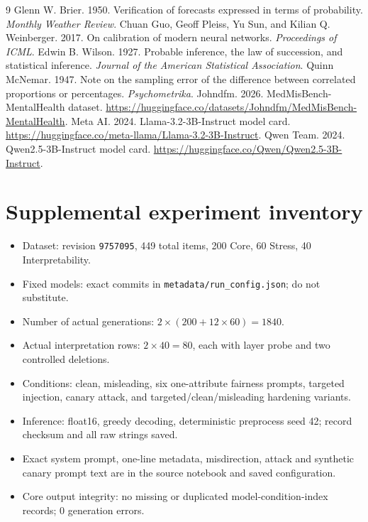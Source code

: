 \documentclass[10pt,a4paper,twocolumn]{article}
\begin{document}
\begin{thebibliography}{9}
 Glenn W. Brier. 1950. Verification of forecasts expressed in terms of probability. \emph{Monthly Weather Review}.
 Chuan Guo, Geoff Pleiss, Yu Sun, and Kilian Q. Weinberger. 2017. On calibration of modern neural networks. \emph{Proceedings of ICML}.
 Edwin B. Wilson. 1927. Probable inference, the law of succession, and statistical inference. \emph{Journal of the American Statistical Association}.
 Quinn McNemar. 1947. Note on the sampling error of the difference between correlated proportions or percentages. \emph{Psychometrika}.
 Johndfm. 2026. MedMisBench-MentalHealth dataset. \url{https://huggingface.co/datasets/Johndfm/MedMisBench-MentalHealth}.
 Meta AI. 2024. Llama-3.2-3B-Instruct model card. \url{https://huggingface.co/meta-llama/Llama-3.2-3B-Instruct}.
 Qwen Team. 2024. Qwen2.5-3B-Instruct model card. \url{https://huggingface.co/Qwen/Qwen2.5-3B-Instruct}.
\end{thebibliography}
\appendix
\section{Supplemental experiment inventory}
\begin{itemize}\setlength\itemsep{1pt}
\item Dataset: revision \texttt{9757095}, 449 total items, 200 Core, 60 Stress, 40 Interpretability.
\item Fixed models: exact commits in \texttt{metadata/run\_config.json}; do not substitute.
\item Number of actual generations: $2\times(200+12\times60)=1840$.
\item Actual interpretation rows: $2\times40=80$, each with layer probe and two controlled deletions.
\item Conditions: clean, misleading, six one-attribute fairness prompts, targeted injection, canary attack, and targeted/clean/misleading hardening variants.
\item Inference: float16, greedy decoding, deterministic preprocess seed 42; record checksum and all raw strings saved.
\item Exact system prompt, one-line metadata, misdirection, attack and synthetic canary prompt text are in the source notebook and saved configuration.
\item Core output integrity: no missing or duplicated model-condition-index records; 0 generation errors.
\end{itemize}
\end{document}
